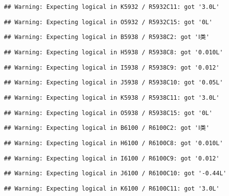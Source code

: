 \documentclass[
]{article}
\begin{document}
\begin{verbatim}
## Warning: Expecting logical in K5932 / R5932C11: got '3.0L'
\end{verbatim}

\begin{verbatim}
## Warning: Expecting logical in O5932 / R5932C15: got '0L'
\end{verbatim}

\begin{verbatim}
## Warning: Expecting logical in B5938 / R5938C2: got 'Ⅰ类'
\end{verbatim}

\begin{verbatim}
## Warning: Expecting logical in H5938 / R5938C8: got '0.010L'
\end{verbatim}

\begin{verbatim}
## Warning: Expecting logical in I5938 / R5938C9: got '0.012'
\end{verbatim}

\begin{verbatim}
## Warning: Expecting logical in J5938 / R5938C10: got '0.05L'
\end{verbatim}

\begin{verbatim}
## Warning: Expecting logical in K5938 / R5938C11: got '3.0L'
\end{verbatim}

\begin{verbatim}
## Warning: Expecting logical in O5938 / R5938C15: got '0L'
\end{verbatim}

\begin{verbatim}
## Warning: Expecting logical in B6100 / R6100C2: got 'Ⅰ类'
\end{verbatim}

\begin{verbatim}
## Warning: Expecting logical in H6100 / R6100C8: got '0.010L'
\end{verbatim}

\begin{verbatim}
## Warning: Expecting logical in I6100 / R6100C9: got '0.012'
\end{verbatim}

\begin{verbatim}
## Warning: Expecting logical in J6100 / R6100C10: got '-0.44L'
\end{verbatim}

\begin{verbatim}
## Warning: Expecting logical in K6100 / R6100C11: got '3.0L'
\end{verbatim}
\end{document}
